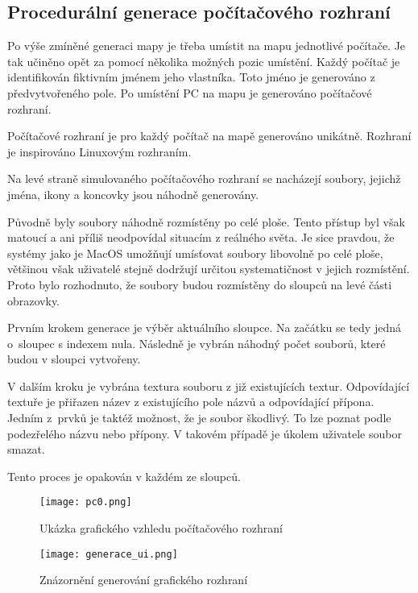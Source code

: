 \subsection{Procedurální generace počítačového rozhraní}
\label{sec:generace_rozhrani}

Po výše zmíněné generaci mapy je třeba umístit na mapu jednotlivé počítače. Je tak učiněno opět za pomocí několika možných pozic umístění. Každý počítač je identifikován fiktivním jménem jeho vlastníka. Toto jméno je generováno z předvytvořeného pole. Po umístění PC na mapu je generováno počítačové rozhraní.

Počítačové rozhraní je pro každý počítač na mapě generováno unikátně. Rozhraní je inspirováno Linuxovým rozhraním.

Na levé straně simulovaného počítačového rozhraní se nacházejí soubory, jejichž jména, ikony a koncovky jsou náhodně generovány.

Původně byly soubory náhodně rozmístěny po celé ploše. Tento přístup byl však matoucí a ani příliš neodpovídal situacím z reálného světa. Je sice pravdou, že systémy jako je MacOS umožňují umísťovat soubory libovolně po celé ploše, většinou však uživatelé stejně dodržují určitou systematičnost v jejich rozmístění. Proto bylo rozhodnuto, že soubory budou rozmístěny do sloupců na levé části obrazovky.

Prvním krokem generace je výběr aktuálního sloupce. Na začátku se tedy jedná o~sloupec s indexem nula. Následně je vybrán náhodný počet souborů, které budou v sloupci vytvořeny.

V dalším kroku je vybrána textura souboru z již existujících textur. Odpovídající textuře je přiřazen název z existujícího pole názvů a odpovídající přípona. Jedním z~prvků je taktéž možnost, že je soubor škodlivý. To lze poznat podle podezřelého názvu nebo přípony. V takovém případě je úkolem uživatele soubor smazat.

Tento proces je opakován v každém ze sloupců.

\begin{figure}[ht]
    \texttt{[image: pc0.png]}
    \centering
    \caption{Ukázka grafického vzhledu počítačového rozhraní}
    \label{fig:pc0_img}
\end{figure}

\begin{figure}[ht]
    \texttt{[image: generace\_ui.png]}
    \centering
    \caption{Znázornění generování grafického rozhraní}
    \label{fig:generace_ui_img}
\end{figure}
